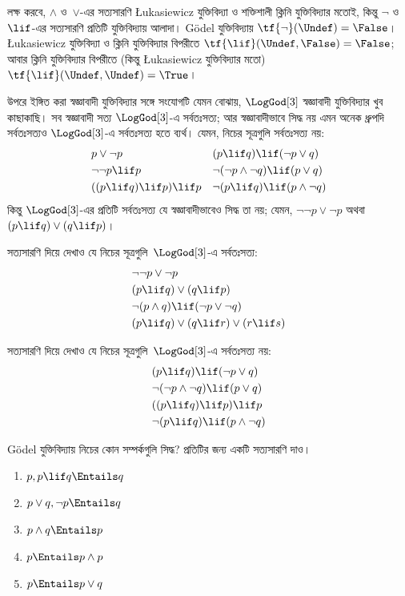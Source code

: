 \documentclass[../../../include/open-logic-section]{subfiles}
\begin{document}
লক্ষ করবে, $\land$ ও~$\lor$-এর সত্যসারণি \L ukasiewicz যুক্তিবিদ্যা ও
শক্তিশালী ক্লিনি যুক্তিবিদ্যার মতোই, কিন্তু $\lnot$ ও~$\lif$-এর
সত্যসারণি প্রতিটি যুক্তিবিদ্যায় আলাদা। G\"odel যুক্তিবিদ্যায়
$\tf{\lnot}(\Undef) = \False$। \L ukasiewicz যুক্তিবিদ্যা ও ক্লিনি
যুক্তিবিদ্যার বিপরীতে $\tf{\lif}(\Undef, \False) = \False$; আবার ক্লিনি
যুক্তিবিদ্যার বিপরীতে (কিন্তু \L ukasiewicz যুক্তিবিদ্যার মতো)
$\tf{\lif}(\Undef, \Undef) = \True$।

উপরে ইঙ্গিত করা স্বজ্ঞাবাদী যুক্তিবিদ্যার সঙ্গে সংযোগটি যেমন বোঝায়,
$\LogGod[3]$ স্বজ্ঞাবাদী যুক্তিবিদ্যার খুব কাছাকাছি। সব স্বজ্ঞাবাদী সত্য
$\LogGod[3]$-এ সর্বতঃসত্য; আর স্বজ্ঞাবাদীভাবে সিদ্ধ নয় এমন অনেক ধ্রুপদি
সর্বতঃসত্যও $\LogGod[3]$-এ সর্বতঃসত্য হতে ব্যর্থ। যেমন, নিচের সূত্রগুলি
সর্বতঃসত্য নয়:
\begin{align*}
  & p \lor \lnot p && (p \lif q) \lif (\lnot p \lor q) \\
  & \lnot\lnot p \lif p && \lnot(\lnot p \land \lnot q) \lif (p \lor q) \\
  & ((p \lif q) \lif p) \lif p && \lnot(p \lif q) \lif (p \land \lnot q)
\end{align*}
কিন্তু $\LogGod[3]$-এর প্রতিটি সর্বতঃসত্য যে স্বজ্ঞাবাদীভাবেও সিদ্ধ তা
নয়; যেমন, $\lnot\lnot p \lor \lnot p$ অথবা
$(p \lif q) \lor (q \lif p)$।

\begin{prob}
  সত্যসারণি দিয়ে দেখাও যে নিচের সূত্রগুলি~$\LogGod[3]$-এ সর্বতঃসত্য:
  \begin{align*}
    & \lnot\lnot p \lor \lnot p\\
    & (p \lif q) \lor (q \lif p) \\
    & \lnot(p \land q) \lif (\lnot p \lor \lnot q) \\
    & (p \lif q) \lor (q \lif r) \lor (r \lif s)
  \end{align*}
\end{prob}

\begin{prob}
  সত্যসারণি দিয়ে দেখাও যে নিচের সূত্রগুলি~$\LogGod[3]$-এ সর্বতঃসত্য নয়:
  \begin{align*}
    & (p \lif q) \lif (\lnot p \lor q) \\
    & \lnot(\lnot p \land \lnot q) \lif (p \lor q) \\
    & ((p \lif q) \lif p) \lif p \\
    & \lnot(p \lif q) \lif (p \land \lnot q)
  \end{align*}
\end{prob}

\begin{prob}
  G\"odel যুক্তিবিদ্যায় নিচের কোন সম্পর্কগুলি সিদ্ধ? প্রতিটির জন্য একটি
  সত্যসারণি দাও।
  \begin{enumerate}
    \item $p, p \lif q \Entails q$
    \item $p \lor q, \lnot p \Entails q$
    \item $p \land q \Entails p$
    \item $p \Entails p \land p$
    \item $p \Entails p \lor q$
  \end{enumerate}
\end{prob}
\end{document}

